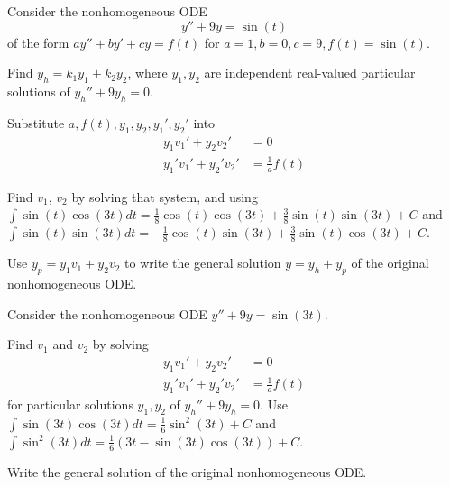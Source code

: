 \begin{applicationActivities}
\begin{activity}{20}
Consider the nonhomogeneous ODE \[y''+9y=\sin(t)\] of the
form \(ay''+by'+cy=f(t)\) for \(a=1,b=0,c=9,f(t)=\sin(t)\).
\vfill
\begin{subactivity}
Find \(y_h=k_1y_1+k_2y_2\), where \(y_1,y_2\) are
independent real-valued particular
solutions of \(y_h''+9y_h=0\).
\end{subactivity}
\begin{subactivity}
Substitute \(a,f(t),y_1,y_2,y_1',y_2'\) into
\begin{alignat*}{2}
y_1 v_1' + y_2 v_2'&=0 \\
y_1' v_1' + y_2' v_2'&=\frac{1}{a}f(t) 
\end{alignat*}
\end{subactivity}
\begin{subactivity}
Find \(v_1\), \(v_2\) by solving that system, and using
\(\int\sin(t)\cos(3t)dt=\frac{1}{8}\cos(t)\cos(3t)+\frac{3}{8}\sin(t)\sin(3t)+C\) and
\(\int\sin(t)\sin(3t)dt=-\frac{1}{8}\cos(t)\sin(3t)+\frac{3}{8}\sin(t)\cos(3t)+C\).
\end{subactivity}
\begin{subactivity}
Use \(y_p=y_1v_1+y_2v_2\) to write the general solution \(y=y_h+y_p\) 
of the original nonhomogeneous ODE.
\end{subactivity}
\end{activity}

\begin{activity}{10}
Consider the nonhomogeneous ODE \(y''+9y=\sin(3t)\).
\vfill
\begin{subactivity}
Find \(v_1\) and \(v_2\) by solving
\begin{alignat*}{2}
y_1 v_1' + y_2 v_2'&=0 \\
y_1' v_1' + y_2' v_2'&=\frac{1}{a}f(t) 
\end{alignat*}
for particular solutions \(y_1,y_2\) of \(y_h''+9y_h=0\).
Use \(\int\sin(3t)\cos(3t)dt=\frac{1}{6}\sin^2(3t)+C\) and
\(\int\sin^2(3t)dt=\frac{1}{6}(3t-\sin(3t)\cos(3t))+C\).
\end{subactivity}
\begin{subactivity}
Write the general solution of the original nonhomogeneous ODE.
\end{subactivity}
\end{activity}

\end{applicationActivities}

